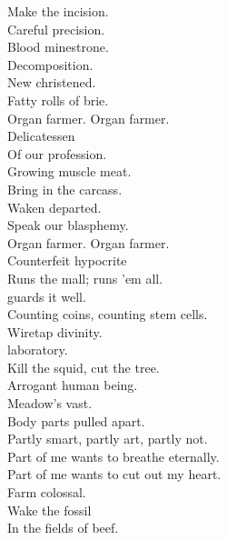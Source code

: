 



Make the incision. \\
Careful precision. \\
Blood minestrone. \\
Decomposition. \\
New  christened. \\
Fatty rolls of brie. \\

Organ farmer. Organ farmer. \\

Delicatessen \\
Of our profession. \\
Growing muscle meat. \\
Bring in the carcass. \\
Waken departed. \\
Speak our blasphemy. \\

Organ farmer. Organ farmer. \\

Counterfeit hypocrite \\
Runs the mall; runs 'em all. \\
 guards it well. \\
Counting coins, counting stem cells. \\
Wiretap divinity. \\
 laboratory. \\
Kill the squid, cut the tree. \\
Arrogant human being. \\
Meadow's vast. \\
Body parts pulled apart. \\
Partly smart, partly art, partly not. \\
Part of me wants to breathe eternally. \\
Part of me wants to cut out my heart. \\

Farm colossal. \\
Wake the fossil \\
In the fields of beef. \\


